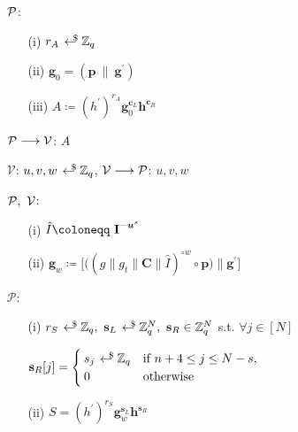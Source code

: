 \begin{mdframed}
\begin{itemize}[itemsep=4pt]
    \vspace{-4pt}
    \item[] $\P$:\vspace{-4pt}
    \begin{enumerate}[itemsep=5pt]
        \item[(i)] $r_A \rgen \Z_q$
        
        \item[(ii)] $\textbf{g}_{0} = ( \textbf{p} \ \| \ \textbf{g}^{\prime} )$
        
        \item[(iii)] $A \coloneqq (h^{\prime})^{r_A} \textbf{g}_0^{\textbf{c}_L} \textbf{h}^{\textbf{c}_R}$ 
        
    \end{enumerate}
  
    \item[] $\mathcal{P} \longrightarrow \V$: $A$

    \item[] $\mathcal{V}$: $u, v, w \rgen \Z_q$, $\mathcal{V} \longrightarrow \P$: $u, v, w$


    \item[] $\P, \ \V$:
    \begin{enumerate}[itemsep=5pt]
        \item[(i)] $\hat{I} \coloneqq \ \textbf{I}^{- \vecnb{u}^s}$
        
        \item[(ii)] $\textbf{g}_{w} \coloneqq \big[ \big((g \| g_t \| \textbf{C} \| \hat{I})^{\circ w} \circ \textbf{p}\big) \|\textbf{g}^{\prime} \big]$
    \end{enumerate}
      
    \item[] $\mathcal{P}$:
    \begin{enumerate}[itemsep=5pt]
        \item[(i)] $r_S \rgen \Z_q, \ \textbf{s}_L \rgen \Z_q^N, \ \textbf{s}_R \in \Z_q^N$ s.t. $\forall j \in [N]$ 
        \vspace{-3mm}
        \item[] $\textbf{s}_R[j] = 
        \begin{cases}
          s_j \rgen \Z_q & \text{if } n+4 \le j \le N-s ,\\
          0 & \text{otherwise}
        \end{cases}$ 
        \item[(ii)] $S = (h^{\prime})^{r_S} \textbf{g}_w^{\textbf{s}_L} \textbf{h}^{\textbf{s}_R}$ 
    \end{enumerate}
    

\end{itemize}
\end{mdframed}
